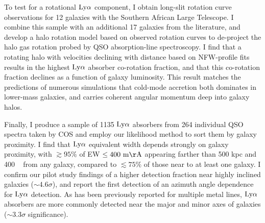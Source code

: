 To test for a rotational $\rm Ly\alpha$ component, I obtain long-slit rotation curve observations for 12 galaxies with the Southern African Large Telescope. I combine this sample with an additional 17 galaxies from the literature, and develop a halo rotation model based on observed rotation curves to de-project the halo gas rotation probed by QSO absorption-line spectroscopy. I find that a rotating halo with velocities declining with distance based on NFW-profile fits results in the highest $\rm Ly\alpha$ absorber co-rotation fraction, and that this co-rotation fraction declines as a function of galaxy luminosity. This result matches the predictions of numerous simulations that cold-mode accretion both dominates in lower-mass galaxies, and carries coherent angular momentum deep into galaxy halos.

Finally, I produce a sample of 1135 $\rm Ly\alpha$ absorbers from 264 individual QSO spectra taken by COS and employ our likelihood method to sort them by galaxy proximity. I find that $\rm Ly\alpha$ equivalent width depends strongly on galaxy proximity, with $\gtrsim 95\%$ of EW $\rm \leq 400~ m\AA$ appearing farther than 500 kpc and 400 \kms~ from any galaxy, compared to $\lesssim75\%$ of those near to at least one galaxy. I confirm our pilot study findings of a higher detection fraction near highly inclined galaxies ($\sim4.6 \sigma$), and report the first detection of an azimuth angle dependence for $\rm Ly\alpha$ detection. As has been previously reported for multiple metal lines, $\rm Ly\alpha$ absorbers are more commonly detected near the major and minor axes of galaxies ($\sim 3.3\sigma$ significance). 